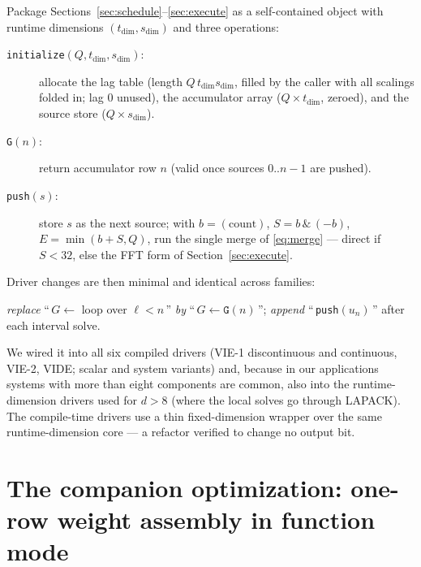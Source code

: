 \documentclass[11pt]{article}
\begin{document}
Package Sections~\ref{sec:schedule}--\ref{sec:execute} as a
self-contained object with runtime dimensions
$(t_{\dim}, s_{\dim})$ and three operations:
\begin{description}
\item[\texttt{initialize}$(Q, t_{\dim}, s_{\dim})$:] allocate the lag
  table (length $Q\,t_{\dim}s_{\dim}$, filled by the caller with all
  scalings folded in; lag 0 unused), the accumulator array
  ($Q\times t_{\dim}$, zeroed), and the source store
  ($Q\times s_{\dim}$).
\item[\texttt{G}$(n)$:] return accumulator row $n$ (valid once sources
  $0..n{-}1$ are pushed).
\item[\texttt{push}$(s)$:] store $s$ as the next source; with
  $b=(\text{count})$, $S=b\,\&\,(-b)$, $E=\min(b+S,Q)$, run the single
  merge of \eqref{eq:merge} --- direct if $S<32$, else the FFT form of
  Section~\ref{sec:execute}.
\end{description}
Driver changes are then minimal and identical across families:
\begin{center}
\emph{replace} ``\,$G\gets$ loop over $\ell<n$\,'' \emph{by}
``\,$G\gets\texttt{G}(n)$\,''; \quad
\emph{append} ``\,\texttt{push}$(u_n)$\,'' after each interval solve.
\end{center}
We wired it into all six compiled drivers (VIE-1 discontinuous and
continuous, VIE-2, VIDE; scalar and system variants) and, because in
our applications systems with more than eight components are common,
also into the runtime-dimension drivers used for $d>8$ (where the local
solves go through LAPACK). The compile-time drivers use a thin
fixed-dimension wrapper over the same runtime-dimension core --- a
refactor verified to change no output bit.

\section{The companion optimization: one-row weight assembly in
function mode}
\label{sec:assembly}
\end{document}
